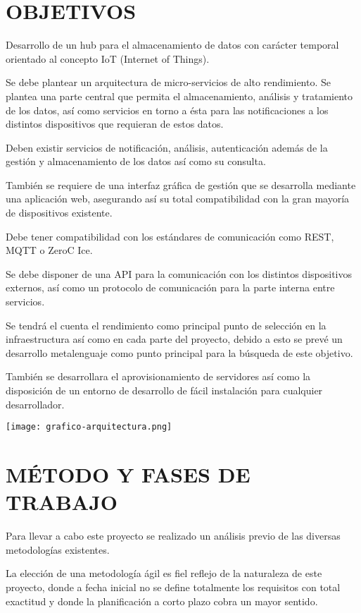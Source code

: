 \documentclass{pre-tfg}
\begin{document}
\section{OBJETIVOS}

Desarrollo de un hub para el almacenamiento de datos con carácter temporal orientado al
concepto IoT (Internet of Things).

Se debe plantear un arquitectura de micro-servicios de alto rendimiento. Se plantea una
parte central que permita el almacenamiento, análisis y tratamiento de los datos, así como
servicios en torno a ésta para las notificaciones a los distintos dispositivos que
requieran de estos datos.

Deben existir servicios de notificación, análisis, autenticación además de la gestión y
almacenamiento de los datos así como su consulta.

También se requiere de una interfaz gráfica de gestión que se desarrolla mediante una
aplicación web, asegurando así su total compatibilidad con la gran mayoría de dispositivos
existente.

Debe tener compatibilidad con los estándares de comunicación como REST, MQTT o ZeroC Ice.

Se debe disponer de una API para la comunicación con los distintos dispositivos externos,
así como un protocolo de comunicación para la parte interna entre servicios.

Se tendrá el cuenta el rendimiento como principal punto de selección en la infraestructura
así como en cada parte del proyecto, debido a esto se prevé un desarrollo metalenguaje
como punto principal para la búsqueda de este objetivo.

También se desarrollara el aprovisionamiento de servidores así como la disposición de un
entorno de desarrollo de fácil instalación para cualquier desarrollador.

\begin{center}
  \texttt{[image: grafico-arquitectura.png]}
\end{center}

\section{MÉTODO Y FASES DE TRABAJO}

Para llevar a cabo este proyecto se realizado un análisis previo de las diversas
metodologías existentes.

La elección de una metodología ágil es fiel reflejo de la naturaleza de este proyecto,
donde a fecha inicial no se define totalmente los requisitos con total exactitud y donde
la planificación a corto plazo cobra un mayor sentido.
\end{document}
